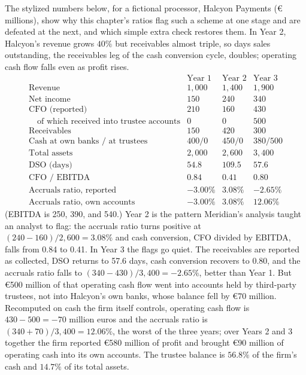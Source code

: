 \documentclass[../ai_in_finance]{subfiles}
\begin{document}
The stylized numbers below, for a fictional processor, Halcyon Payments (\euro{} millions), show why this chapter's ratios flag such a scheme at one stage and are defeated at the next, and which simple extra check restores them. In Year 2, Halcyon's revenue grows $40\%$ but receivables almost triple, so days sales outstanding, the receivables leg of the cash conversion cycle, doubles; operating cash flow falls even as profit rises.
\begin{equation*}
\begin{array}{lrrr}
 & \text{Year 1} & \text{Year 2} & \text{Year 3} \\
\text{Revenue} & 1{,}000 & 1{,}400 & 1{,}900 \\
\text{Net income} & 150 & 240 & 340 \\
\text{CFO (reported)} & 210 & 160 & 430 \\
\quad\text{of which received into trustee accounts} & 0 & 0 & 500 \\
\text{Receivables} & 150 & 420 & 300 \\
\text{Cash at own banks / at trustees} & 400 / 0 & 450 / 0 & 380 / 500 \\
\text{Total assets} & 2{,}000 & 2{,}600 & 3{,}400 \\
\text{DSO (days)} & 54.8 & 109.5 & 57.6 \\
\text{CFO / EBITDA} & 0.84 & 0.41 & 0.80 \\
\text{Accruals ratio, reported} & -3.00\% & 3.08\% & -2.65\% \\
\text{Accruals ratio, own accounts} & -3.00\% & 3.08\% & 12.06\%
\end{array}
\end{equation*}
(EBITDA is 250, 390, and 540.) Year 2 is the pattern Meridian's analysis taught an analyst to flag: the accruals ratio turns positive at $(240-160)/2{,}600 = 3.08\%$ and cash conversion, CFO divided by EBITDA, falls from 0.84 to 0.41. In Year 3 the flags go quiet. The receivables are reported as collected, DSO returns to 57.6 days, cash conversion recovers to 0.80, and the accruals ratio falls to $(340-430)/3{,}400 = -2.65\%$, better than Year 1. But \euro500 million of that operating cash flow went into accounts held by third-party trustees, not into Halcyon's own banks, whose balance fell by \euro70 million. Recomputed on cash the firm itself controls, operating cash flow is $430 - 500 = -70$ million euros and the accruals ratio is $(340 + 70)/3{,}400 = 12.06\%$, the worst of the three years; over Years 2 and 3 together the firm reported \euro580 million of profit and brought \euro90 million of operating cash into its own accounts. The trustee balance is $56.8\%$ of the firm's cash and $14.7\%$ of its total assets.
\end{document}
